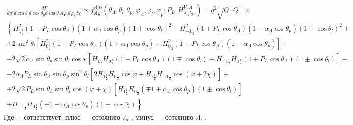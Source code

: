 \documentclass[a0,portrait]{a0poster}
\newcommand{\inrad}[1]{\left( #1 \right)}
\newcommand{\inner}[1]{\left( #1 \right)}
\renewcommand{\phi}{\varphi}
\begin{document}
\begin{mdframed}[style=MyFrame]
\begin{multicols}{2}
\begin{multline*}
    \frac{d\Gamma}{dq^2 d\cos\theta_l d\cos\theta_p d\cos\theta_d d\phi_l d\phi_p d\chi} \propto f^{\Lambda_l \nu_l}_{\text{sig}}\inner{\theta_\Lambda, \theta_l, \theta_p, \phi_\Lambda, \phi_l, \phi_p; P_L, H^{V, A}_{\lambda_\Lambda \lambda_W}} = q^2 \sqrt{Q_+ Q_-}  \times \\
    \left\{ H_{1\frac{1}{2}}^2 \inrad{1 - P_L \cos\theta_\Lambda} \inrad{1 + \alpha_\Lambda \cos\theta_p} \inrad{1 \pm \cos\theta_l}^2
    + H_{-1\frac{1}{2}}^2 \inrad{1 + P_L \cos\theta_\Lambda} \inrad{1 - \alpha_\Lambda \cos\theta_p} \inrad{1 \mp \cos\theta_l}^2 + \right. \\
    + 2 \sin^2\theta_l \left[ H_{0\frac{1}{2}}^2 \inrad{1 + P_L \cos\theta_\Lambda} \inrad{1 + \alpha_\Lambda \cos\theta_p} + H_{0\frac{1}{2}}^2 \inrad{1 - P_L \cos\theta_\Lambda} \inrad{1 - \alpha_\Lambda \cos\theta_p} \right] - \\
    - 2\sqrt{2} \alpha_\Lambda \sin\theta_p \sin\theta_l \cos\chi \left[ H_{1\frac{1}{2}} H_{0\frac{1}{2}} \inrad{1 - P_L \cos\theta_\Lambda} \inrad{1 \mp \cos\theta_l} + H_{-1\frac{1}{2}} H_{0\frac{1}{2}} \inrad{1 + P_L \cos\theta_\Lambda} \inrad{1 \pm \cos\theta_l} \right] -\\
    - 2\alpha_\Lambda P_L \sin\theta_\Lambda \sin\theta_p \sin^2\theta_l \left[ 2H_{0\frac{1}{2}} H_{0\frac{1}{2}} \cos\varphi + H_{1\frac{1}{2}} H_{-1\frac{1}{2}} \cos(\varphi + 2\chi) \right] +\\
    + 2\sqrt{2} P_L \sin\theta_\Lambda \sin\theta_l \cos(\varphi + \chi) \left[ H_{1\frac{1}{2}} H_{0\frac{1}{2}} \inrad{\mp 1 + \alpha_\Lambda \cos\theta_p} \inrad{1 \pm \cos\theta_l} \right] \\
    \left.+ H_{-1\frac{1}{2}} H_{0\frac{1}{2}} \inrad{\mp 1 - \alpha_\Lambda \cos\theta_p} \inrad{1 \mp \cos\theta_l} \right\}
\end{multline*}
Где $\pm$ сответствует: плюс --- сотоянию $\Lambda_c^+$, минус --- сотоянию $\Lambda_c^-$.


\end{multicols}
\end{mdframed}
\end{document}
